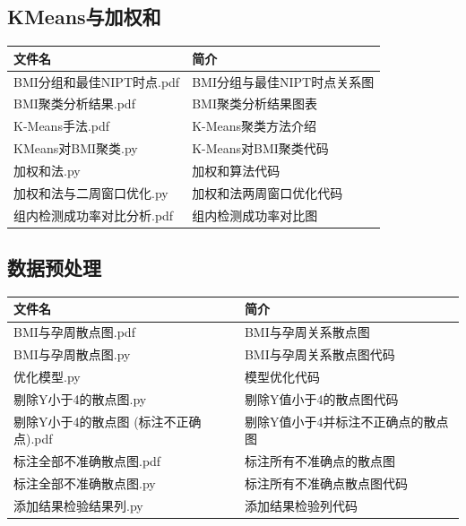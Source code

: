 \documentclass[a4paper, oneside, 12pt]{article}
\begin{document}
\subsection*{KMeans与加权和}
\begin{table}[H]
    \centering
    \fangsong
    \begin{tabularx}{\textwidth}{>{\RaggedRight}X >{\RaggedRight}X}
        \toprule
        \textbf{文件名}       & \textbf{简介}       \\
        \midrule
        BMI分组和最佳NIPT时点.pdf & BMI分组与最佳NIPT时点关系图 \\
        BMI聚类分析结果.pdf      & BMI聚类分析结果图表       \\
        K-Means手法.pdf      & K-Means聚类方法介绍     \\
        KMeans对BMI聚类.py    & K-Means对BMI聚类代码   \\
        加权和法.py            & 加权和算法代码           \\
        加权和法与二周窗口优化.py     & 加权和法两周窗口优化代码      \\
        组内检测成功率对比分析.pdf    & 组内检测成功率对比图        \\
        \bottomrule
    \end{tabularx}
\end{table}

\subsection*{数据预处理}
\begin{table}[H]
    \centering
    \fangsong
    \begin{tabularx}{\textwidth}{>{\RaggedRight}X >{\RaggedRight}X}
        \toprule
        \textbf{文件名}            & \textbf{简介}        \\
        \midrule
        BMI与孕周散点图.pdf           & BMI与孕周关系散点图        \\
        BMI与孕周散点图.py            & BMI与孕周关系散点图代码      \\
        优化模型.py                 & 模型优化代码             \\
        剔除Y小于4的散点图.py           & 剔除Y值小于4的散点图代码      \\
        剔除Y小于4的散点图 (标注不正确点).pdf & 剔除Y值小于4并标注不正确点的散点图 \\
        标注全部不准确散点图.pdf          & 标注所有不准确点的散点图       \\
        标注全部不准确散点图.py           & 标注所有不准确点散点图代码      \\
        添加结果检验结果列.py            & 添加结果检验列代码          \\
        \bottomrule
    \end{tabularx}
\end{table}
\end{document}
